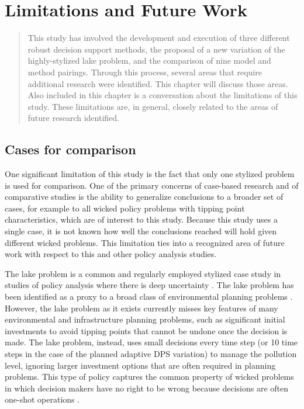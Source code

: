 \chapter{Limitations and Future Work}
\label{chapter-futurework}

\begin{abstract}
    This study has involved the development and execution of three different robust decision support methods, the proposal of a new variation of the highly-stylized lake problem, and the comparison of nine model and method pairings. Through this process, several areas that require additional research were identified. This chapter will discuss those areas. Also included in this chapter is a conversation about the limitations of this study. These limitations are, in general, closely related to the areas of future research identified.
\end{abstract}

\newpage

\section{Cases for comparison}
One significant limitation of this study is the fact that only one stylized problem is used for comparison. One of the primary concerns of case-based research and of comparative studies is the ability to generalize conclusions to a broader set of cases, for example to all wicked policy problems with tipping point characteristics, which are of interest to this study. Because this study uses a single case, it is not known how well the conclusions reached will hold given different wicked problems. This limitation ties into a recognized area of future work with respect to this and other policy analysis studies. 

The lake problem is a common and regularly employed stylized case study in studies of policy analysis where there is deep uncertainty \citep{Quinn2017, Ward2015}. The lake problem has been identified as a proxy to a broad class of environmental planning problems \citep{Quinn2017,Singh2015}. However, the lake problem as it exists currently misses key features of many environmental and infrastructure planning problems, such as significant initial investments to avoid tipping points that cannot be undone once the decision is made. The lake problem, instead, uses small decisions every time step (or 10 time steps in the case of the planned adaptive DPS variation) to manage the pollution level, ignoring larger investment options that are often required in planning problems. This type of policy captures the common property of wicked problems in which decision makers have no right to be wrong because decisions are often one-shot operations \citep{Rittel1973}. 

